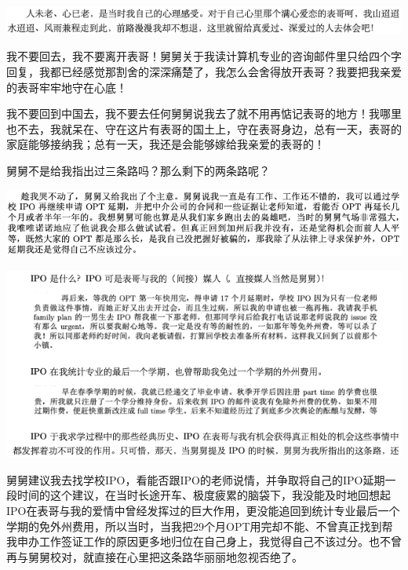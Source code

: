 \documentclass[9pt, b5paper]{article}
\begin{document}
\begin{center}
\includegraphics[width=.9\linewidth]{./pic/backups_plans_20210416_080253.png}
\end{center}

我不要回去，我不要离开表哥！舅舅关于我读计算机专业的咨询邮件里只给四个字回复，我都已经感觉那割舍的深深痛楚了，我怎么会舍得放开表哥？我要把我亲爱的表哥牢牢地守在心底！

我不要回到中国去，我不要去任何舅舅说我去了就不用再惦记表哥的地方！我哪里也不去，我就呆在、守在这片有表哥的国土上，守在表哥身边，总有一天，表哥的家庭能够接纳我；总有一天，我还是会能够嫁给我亲爱的表哥的！

舅舅不是给我指出过三条路吗？那么剩下的两条路呢？

\begin{center}
\includegraphics[width=.9\linewidth]{./pic/backups_plans_20210416_073313.png}
\end{center}

\begin{center}
\includegraphics[width=.9\linewidth]{./pic/backups_plans_20210416_074042.png}
\end{center}

舅舅建议我去找学校IPO，看能否跟IPO的老师说情，并争取将自己的IPO延期一段时间的这个建议，在当时长途开车、极度疲累的脑袋下，我没能及时地回想起IPO在表哥与我的爱情中曾经发挥过的巨大作用，更没能追回到统计专业最后一个学期的免外州费用，所以当时，当我把29个月OPT用完却不能、不曾真正找到帮我申办工作签证工作的原因更多地归位在自己身上，我觉得自己不该过分。也不曾再与舅舅校对，就直接在心里把这条路华丽丽地忽视否绝了。 
\end{document}
